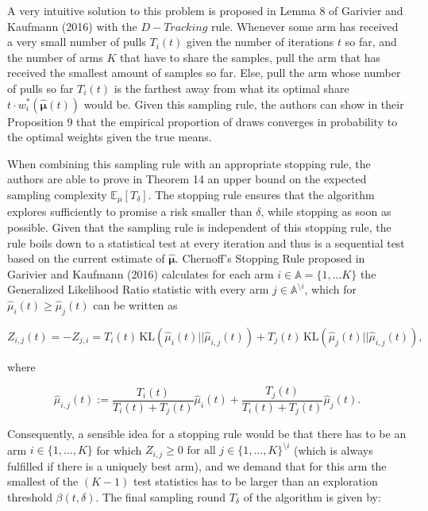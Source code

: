 \documentclass[11pt,]{article}
\newcommand{\KL}{\,\text{KL}}
\begin{document}
A very intuitive solution to this problem is proposed in Lemma 8 of
Garivier and Kaufmann (2016) with the \(D-Tracking\) rule. Whenever some
arm has received a very small number of pulls \(T_i(t)\) given the
number of iterations \(t\) so far, and the number of arms \(K\) that
have to share the samples, pull the arm that has received the smallest
amount of samples so far. Else, pull the arm whose number of pulls so
far \(T_i(t)\) is the farthest away from what its optimal share
\(t\cdot w^*_i(\hat{\bm{\mu}}(t))\) would be. Given this sampling rule,
the authors can show in their Proposition 9 that the empirical
proportion of draws converges in probability to the optimal weights
given the true means.

When combining this sampling rule with an appropriate stopping rule, the
authors are able to prove in Theorem 14 an upper bound on the expected
sampling complexity \(\mathbb{E}_{\mu}[T_{\delta}]\). The stopping rule
ensures that the algorithm explores sufficiently to promise a risk
smaller than \(\delta\), while stopping as soon as possible. Given that
the sampling rule is independent of this stopping rule, the rule boils
down to a statistical test at every iteration and thus is a sequential
test based on the current estimate of \(\hat{\bm{\mu}}\). Chernoff's
Stopping Rule proposed in Garivier and Kaufmann (2016) calculates for
each arm \(i\in \mathbb{A} = \{1,...K\}\) the Generalized Likelihood
Ratio statistic with every arm \(j \in \mathbb{A}^{\setminus i}\), which
for \(\hat{\mu}_i(t) \geq \hat{\mu}_j(t)\) can be written as

\begin{equation*}
Z_{i,j}(t) = - Z_{j,i} = T_i(t) \KL(\hat{\mu}_i(t) || \hat{\mu}_{i,j}(t)) + T_j(t) \KL(\hat{\mu}_{j}(t) || \hat{\mu}_{i,j}(t)),
\end{equation*}

where

\begin{equation*}
\hat{\mu}_{i,j}(t) := \frac{T_i(t)}{T_i(t) + T_j(t)}\hat{\mu}_i(t) + \frac{T_j(t)}{T_i(t) + T_j(t)}\hat{\mu}_j(t).
\end{equation*}

Consequently, a sensible idea for a stopping rule would be that there
has to be an arm \(i \in \{1,...,K\}\) for which
\(Z_{i,j} \geq 0 \text{ for all } j \in \{1,...,K\}^{\setminus i}\)
(which is always fulfilled if there is a uniquely best arm), and we
demand that for this arm the smallest of the \((K-1)\) test statistics
has to be larger than an exploration threshold \(\beta(t, \delta)\). The
final sampling round \(T_{\delta}\) of the algorithm is given by:
\end{document}
